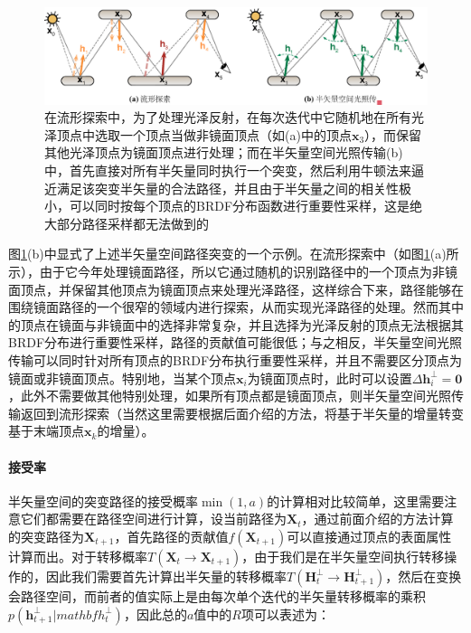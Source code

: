 \begin{figure}
\begin{fullwidth}
	\includegraphics[width=1.0\thewidth]{figures/mlt/me-vs-hslt}
	\caption{在流形探索中，为了处理光泽反射，在每次迭代中它随机地在所有光泽顶点中选取一个顶点当做非镜面顶点（如(a)中的顶点$\mathbf{x}_3$），而保留其他光泽顶点为镜面顶点进行处理；而在半矢量空间光照传输(b)中，首先直接对所有半矢量同时执行一个突变，然后利用牛顿法来逼近满足该突变半矢量的合法路径，并且由于半矢量之间的相关性极小，可以同时按每个顶点的BRDF分布函数进行重要性采样，这是绝大部分路径采样都无法做到的}
	\label{f:mlt-me-vs-hslt}
\end{fullwidth}
\end{figure}

图\ref{f:mlt-me-vs-hslt}(b)中显式了上述半矢量空间路径突变的一个示例。在流形探索中（如图\ref{f:mlt-me-vs-hslt}(a)所示），由于它今年处理镜面路径，所以它通过随机的识别路径中的一个顶点为非镜面顶点，并保留其他顶点为镜面顶点来处理光泽路径，这样综合下来，路径能够在围绕镜面路径的一个很窄的领域内进行探索，从而实现光泽路径的处理。然而其中的顶点在镜面与非镜面中的选择非常复杂，并且选择为光泽反射的顶点无法根据其BRDF分布进行重要性采样，路径的贡献值可能很低；与之相反，半矢量空间光照传输可以同时针对所有顶点的BRDF分布执行重要性采样，并且不需要区分顶点为镜面或非镜面顶点。特别地，当某个顶点$\mathbf{x}_i$为镜面顶点时，此时可以设置$\Delta\mathbf{h}^{\perp}_i=\mathbf{0}$，此外不需要做其他特别处理，如果所有顶点都是镜面顶点，则半矢量空间光照传输返回到流形探索（当然这里需要根据后面介绍的方法，将基于半矢量的增量转变基于末端顶点$\mathbf{x}_k$的增量）。



\paragraph{接受率}
半矢量空间的突变路径的接受概率$\min(1,a)$的计算相对比较简单，这里需要注意它们都需要在路径空间进行计算，设当前路径为$\mathbf{X}_t$，通过前面介绍的方法计算的突变路径为$\mathbf{X}_{t+1}$，首先路径的贡献值$f(\mathbf{X}_{t+1})$可以直接通过顶点的表面属性计算而出。对于转移概率$T(\mathbf{X}_t\to\mathbf{X}_{t+1})$，由于我们是在半矢量空间执行转移操作的，因此我们需要首先计算出半矢量的转移概率$T(\mathbf{H}^{\perp}_t\to\mathbf{H}^{\perp}_{t+1})$，然后在变换会路径空间，而前者的值实际上是由每次单个迭代的半矢量转移概率的乘积$p(\mathbf{h}^{\perp}_{t+1}|mathbf{h}^{\perp}_t)$，因此总的$a$值中的$R$项可以表述为：

